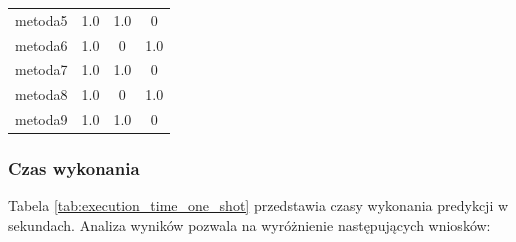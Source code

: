 \begin{table}[H]
\begin{tabular}{lccc}
		metoda5           & 1.0           & 1.0              &   0            \\
		metoda6           & 1.0           &   0              & 1.0            \\
		metoda7           & 1.0           & 1.0              &   0            \\
		metoda8           & 1.0           &   0              & 1.0            \\
		metoda9           & 1.0           & 1.0              &   0            \\
		\bottomrule
	\end{tabular}
\end{table}

\subsubsection{Czas wykonania}
Tabela \ref{tab:execution_time_one_shot} przedstawia czasy wykonania predykcji w sekundach. Analiza wyników pozwala na wyróżnienie następujących wniosków:

